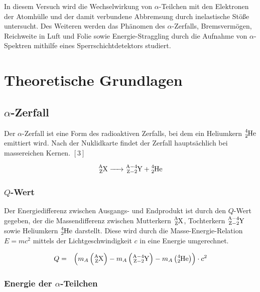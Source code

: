 \documentclass[12pt,a4paper]{scrartcl}
\numberwithin{equation}{section} %
\renewcommand{\[}{} %
\renewcommand{\]}{\noindent} %
\begin{document}
In diesem Versuch wird die Wechselwirkung von \(\alpha\)-Teilchen mit
den Elektronen der Atomhülle und der damit verbundene Abbremsung durch
inelastische Stöße untersucht. Des Weiteren werden das Phänomen des
\(\alpha\)-Zerfalls, Bremsvermögen, Reichweite in Luft und Folie sowie
Energie-Straggling durch die Aufnahme von \(\alpha\)-Spektren mithilfe
eines Sperrschichtdetektors studiert.

\hypertarget{theoretische-grundlagen}{%
\section{Theoretische Grundlagen}\label{theoretische-grundlagen}}

\hypertarget{alpha-zerfall}{%
\subsection{\texorpdfstring{\(\alpha\)-Zerfall}{\textbackslash alpha-Zerfall}}\label{alpha-zerfall}}

Der \(\alpha\)-Zerfall ist eine Form des radioaktiven Zerfalls, bei dem
ein Heliumkern \(\ce{^4_2He}\) emittiert wird. Nach der Nuklidkarte
findet der Zerfall hauptsächlich bei massereichen Kernen. \([3]\)

\[
\begin{eqnarray}
    \ce{^A_ZX -> ^{A-4}_{Z-2}Y + ^4_2He}
\end{eqnarray}
\]

\hypertarget{q-wert}{%
\subsubsection{\texorpdfstring{\(Q\)-Wert}{Q-Wert}}\label{q-wert}}

Der Energiedifferenz zwischen Ausgangs- und Endprodukt ist durch den
\(Q\)-Wert gegeben, der die Massendifferenz zwischen Mutterkern
\(\ce{^A_ZX}\), Tochterkern \(\ce{^{A-4}_{Z-2}Y}\) sowie Heliumkern
\(\ce{^4_2He}\) darstellt. Diese wird durch die Masse-Energie-Relation
\(E=mc^2\) mittels der Lichtgeschwindigkeit \(c\) in eine Energie
umgerechnet.

\[
\begin{eqnarray}
    Q &=&
        \left(m_{A}
            \left(\ce{^A_ZX}\right)
            - m_{A}\left(\ce{^{A-4}_{Z-2}Y}\right)
            - m_{A}\left(\ce{^4_2He}\right)
        \right) \cdot c^2
\end{eqnarray}
\]

\hypertarget{energie-der-alpha-teilchen}{%
\subsubsection{\texorpdfstring{Energie der
\(\alpha\)-Teilchen}{Energie der \textbackslash alpha-Teilchen}}\label{energie-der-alpha-teilchen}}
\end{document}
